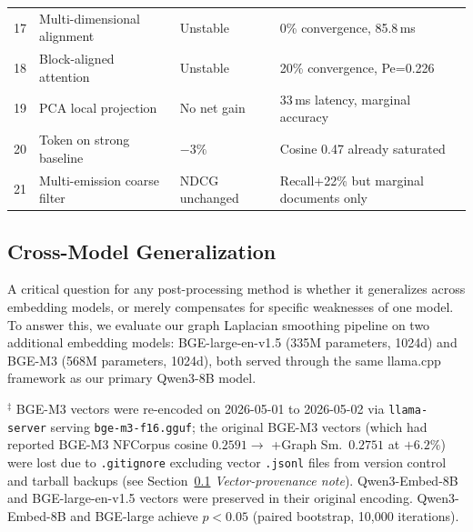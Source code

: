 \documentclass[review,1p]{elsarticle}
\begin{document}
\begin{table}[ht]
{\begin{tabular}{clll}
17 & Multi-dimensional alignment & Unstable & 0\% convergence, 85.8\,ms \\
18 & Block-aligned attention & Unstable & 20\% convergence, Pe=0.226 \\
19 & PCA local projection & No net gain & 33\,ms latency, marginal accuracy \\
20 & Token on strong baseline & $-3\%$ & Cosine 0.47 already saturated \\
21 & Multi-emission coarse filter & NDCG unchanged & Recall+22\% but marginal documents only \\
\bottomrule
\end{tabular}
}
\end{table}

\subsection{Cross-Model Generalization}
\label{subsec:cross-model}

A critical question for any post-processing method is whether it generalizes across embedding models, or merely compensates for specific weaknesses of one model. To answer this, we evaluate our graph Laplacian smoothing pipeline on two additional embedding models: BGE-large-en-v1.5 (335M parameters, 1024d) and BGE-M3 (568M parameters, 1024d), both served through the same llama.cpp framework as our primary Qwen3-8B model.

\begin{table}[ht]
\centering
\caption{Cross-model generalization on NFCorpus (323 queries).}
\label{tab:cross-model}

\vspace{4pt}
{\footnotesize $^\ddagger$ BGE-M3 vectors were re-encoded on 2026-05-01 to 2026-05-02 via \texttt{llama-server} serving \texttt{bge-m3-f16.gguf}; the original BGE-M3 vectors (which had reported BGE-M3 NFCorpus cosine $0.2591 \to$ +Graph Sm.\ $0.2751$ at $+6.2\%$) were lost due to \texttt{.gitignore} excluding vector \texttt{.jsonl} files from version control and tarball backups (see Section~\ref{subsec:cross-model} \textit{Vector-provenance note}). Qwen3-Embed-8B and BGE-large-en-v1.5 vectors were preserved in their original encoding. Qwen3-Embed-8B and BGE-large achieve $p < 0.05$ (paired bootstrap, 10{,}000 iterations).}
\end{table}
\end{document}
